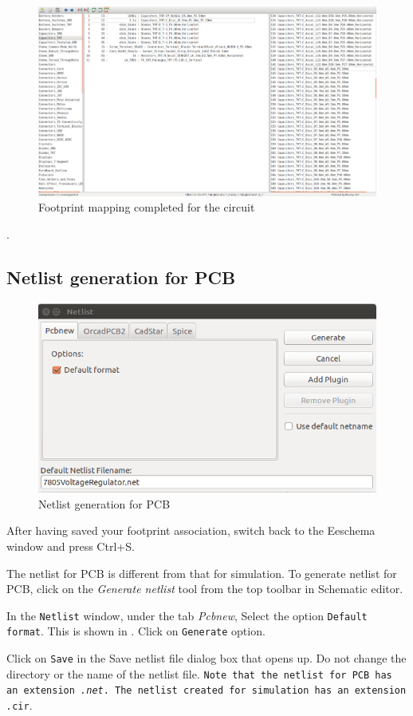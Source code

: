 \begin{figure}
\centering
\includegraphics[width=0.85\linewidth]{manual_images/map.png}
\caption{Footprint mapping completed for the circuit}
\label{map}
\end{figure}.

\subsection{Netlist generation for PCB}
  
\label{netc}
\begin{figure}
\centering
\includegraphics[width=\lgfig]{manual_images/netlistpcb.png}
\caption{Netlist generation for PCB}
\label{netlistpcb}
\end{figure}   

\begin{compactenum}
\item After having saved your footprint association, switch back to the Eeschema window and press Ctrl+S.
\item The netlist for PCB is different from that for simulation. To generate
netlist for PCB, click on the \textit{Generate netlist} tool from the
top toolbar in Schematic editor.
\item In the \texttt{Netlist} window, under the tab \textit{Pcbnew}, Select the option \texttt{Default format}. This is shown in . Click on \texttt{Generate} option. 
\item Click on \texttt{Save} in the Save netlist file dialog box that opens up. Do not change the directory or the name of the netlist file. \texttt{Note that the netlist for PCB has an extension \emph{.net}. The netlist created for simulation has an extension \emph .cir}.
\end{compactenum}



